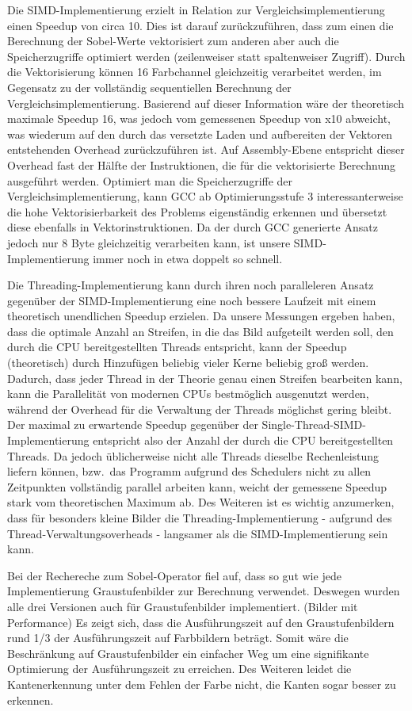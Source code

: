 \documentclass[course=erap]{aspdoc}
\begin{document}
Die SIMD-Implementierung erzielt in Relation zur Vergleichsimplementierung einen Speedup von circa 10.
Dies ist darauf zurückzuführen, dass zum einen die Berechnung der Sobel-Werte vektorisiert zum anderen aber auch die Speicherzugriffe optimiert werden (zeilenweiser statt spaltenweiser Zugriff).
Durch die Vektorisierung können 16 Farbchannel gleichzeitig verarbeitet werden, im Gegensatz zu der vollständig sequentiellen Berechnung der Vergleichsimplementierung.
Basierend auf dieser Information wäre der theoretisch maximale Speedup 16, was jedoch vom gemessenen Speedup von x10 abweicht, was wiederum auf den durch das versetzte Laden und aufbereiten der Vektoren entstehenden Overhead zurückzuführen ist.
Auf Assembly-Ebene entspricht dieser Overhead fast der Hälfte der Instruktionen, die für die vektorisierte Berechnung ausgeführt werden.
Optimiert man die Speicherzugriffe der Vergleichsimplementierung, kann GCC ab Optimierungsstufe 3 interessanterweise die hohe Vektorisierbarkeit des Problems eigenständig erkennen und übersetzt diese ebenfalls in Vektorinstruktionen.
Da der durch GCC generierte Ansatz jedoch nur 8 Byte gleichzeitig verarbeiten kann, ist unsere SIMD-Implementierung immer noch in etwa doppelt so schnell.

Die Threading-Implementierung kann durch ihren noch paralleleren Ansatz gegenüber der SIMD-Implementierung eine noch bessere Laufzeit mit einem theoretisch unendlichen Speedup erzielen.
Da unsere Messungen ergeben haben, dass die optimale Anzahl an Streifen, in die das Bild aufgeteilt werden soll, den durch die CPU bereitgestellten Threads entspricht, kann der Speedup (theoretisch) durch Hinzufügen beliebig vieler Kerne beliebig groß werden.
Dadurch, dass jeder Thread in der Theorie genau einen Streifen bearbeiten kann, kann die Parallelität von modernen CPUs bestmöglich ausgenutzt werden, während der Overhead für die Verwaltung der Threads möglichst gering bleibt.
Der maximal zu erwartende Speedup gegenüber der Single-Thread-SIMD-Implementierung entspricht also der Anzahl der durch die CPU bereitgestellten Threads.
Da jedoch üblicherweise nicht alle Threads dieselbe Rechenleistung liefern können, bzw.\ das Programm aufgrund des Schedulers nicht zu allen Zeitpunkten vollständig parallel arbeiten kann, weicht der gemessene Speedup stark vom theoretischen Maximum ab.
Des Weiteren ist es wichtig anzumerken, dass für besonders kleine Bilder die Threading-Implementierung - aufgrund des Thread-Verwaltungsoverheads - langsamer als die SIMD-Implementierung sein kann.

Bei der Rechereche zum Sobel-Operator fiel auf, dass so gut wie jede Implementierung Graustufenbilder zur Berechnung verwendet.
Deswegen wurden alle drei Versionen auch für Graustufenbilder implementiert.
(Bilder mit Performance)
Es zeigt sich, dass die Ausführungszeit auf den Graustufenbildern rund 1/3 der Ausführungszeit auf Farbbildern beträgt.
Somit wäre die Beschränkung auf Graustufenbilder ein einfacher Weg um eine signifikante Optimierung der Ausführungszeit zu erreichen.
Des Weiteren leidet die Kantenerkennung unter dem Fehlen der Farbe nicht, die Kanten sogar besser zu erkennen.
\end{document}

